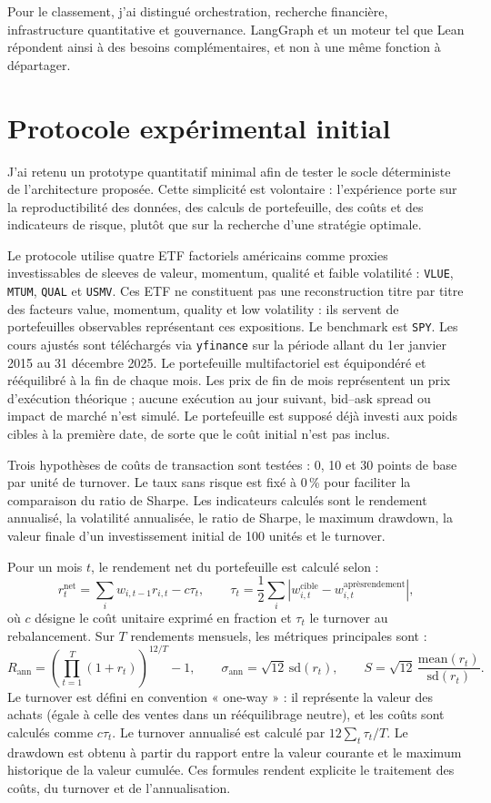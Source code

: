 Pour le classement, j'ai distingué orchestration, recherche financière, infrastructure quantitative et gouvernance. LangGraph et un moteur tel que Lean répondent ainsi à des besoins complémentaires, et non à une même fonction à départager.

\section{Protocole expérimental initial}

J'ai retenu un prototype quantitatif minimal afin de tester le socle déterministe de l'architecture proposée. Cette simplicité est volontaire : l'expérience porte sur la reproductibilité des données, des calculs de portefeuille, des coûts et des indicateurs de risque, plutôt que sur la recherche d'une stratégie optimale.

Le protocole utilise quatre ETF factoriels américains comme proxies investissables de sleeves de valeur, momentum, qualité et faible volatilité : \texttt{VLUE}, \texttt{MTUM}, \texttt{QUAL} et \texttt{USMV}. Ces ETF ne constituent pas une reconstruction titre par titre des facteurs value, momentum, quality et low volatility : ils servent de portefeuilles observables représentant ces expositions. Le benchmark est \texttt{SPY}. Les cours ajustés sont téléchargés via \texttt{yfinance} \citep{yfinance} sur la période allant du 1er janvier 2015 au 31 décembre 2025. Le portefeuille multifactoriel est équipondéré et rééquilibré à la fin de chaque mois. Les prix de fin de mois représentent un prix d'exécution théorique ; aucune exécution au jour suivant, bid--ask spread ou impact de marché n'est simulé. Le portefeuille est supposé déjà investi aux poids cibles à la première date, de sorte que le coût initial n'est pas inclus.

Trois hypothèses de coûts de transaction sont testées : 0, 10 et 30 points de base par unité de turnover. Le taux sans risque est fixé à 0\,\% pour faciliter la comparaison du ratio de Sharpe. Les indicateurs calculés sont le rendement annualisé, la volatilité annualisée, le ratio de Sharpe, le maximum drawdown, la valeur finale d'un investissement initial de 100 unités et le turnover.

Pour un mois $t$, le rendement net du portefeuille est calculé selon :
\[
r_t^{\mathrm{net}} = \sum_i w_{i,t-1}r_{i,t} - c\tau_t,
\qquad
\tau_t = \frac{1}{2}\sum_i\left|w^{\mathrm{cible}}_{i,t}-w^{\mathrm{après rendement}}_{i,t}\right|,
\]
où $c$ désigne le coût unitaire exprimé en fraction et $\tau_t$ le turnover au rebalancement. Sur $T$ rendements mensuels, les métriques principales sont :
\[
R_{\mathrm{ann}} = \left(\prod_{t=1}^{T}(1+r_t)\right)^{12/T}-1,
\qquad
\sigma_{\mathrm{ann}} = \sqrt{12}\,\mathrm{sd}(r_t),
\qquad
S = \sqrt{12}\,\frac{\mathrm{mean}(r_t)}{\mathrm{sd}(r_t)}.
\]
Le turnover est défini en convention « one-way » : il représente la valeur des achats (égale à celle des ventes dans un rééquilibrage neutre), et les coûts sont calculés comme $c\tau_t$. Le turnover annualisé est calculé par $12\sum_t\tau_t/T$. Le drawdown est obtenu à partir du rapport entre la valeur courante et le maximum historique de la valeur cumulée. Ces formules rendent explicite le traitement des coûts, du turnover et de l'annualisation.

